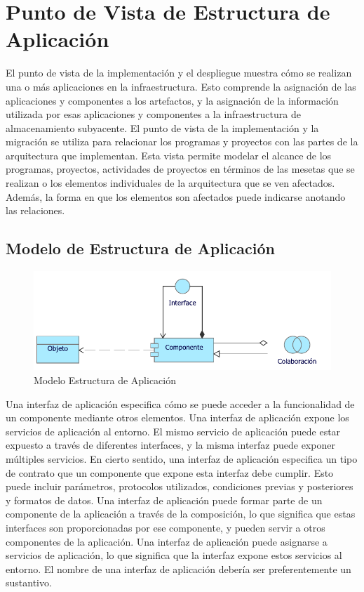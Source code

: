 \section{Punto de Vista de Estructura de Aplicación}

El punto de vista de la implementación y el despliegue muestra cómo se realizan una o más aplicaciones en la infraestructura. Esto comprende la asignación de las aplicaciones y componentes a los artefactos, y la asignación de la información utilizada por esas aplicaciones y componentes a la infraestructura de almacenamiento subyacente. 
El punto de vista de la implementación y la migración se utiliza para relacionar los programas y proyectos con las partes de la arquitectura que implementan. Esta vista permite modelar el alcance de los programas, proyectos, actividades de proyectos en términos de las mesetas que se realizan o los elementos individuales de la arquitectura que se ven afectados. Además, la forma en que los elementos son afectados puede indicarse anotando las relaciones.

\subsection{Modelo de Estructura de Aplicación}
\begin{figure}[h!]
	\centering
	\includegraphics[width=.8\linewidth]{imgs/modelo/EstrAplicacion}
	\caption{Modelo Estructura de Aplicación}
\end{figure}

Una interfaz de aplicación especifica cómo se puede acceder a la funcionalidad de un componente mediante otros elementos. Una interfaz de aplicación expone los servicios de aplicación al entorno. El mismo servicio de aplicación puede estar expuesto a través de diferentes interfaces, y la misma interfaz puede exponer múltiples servicios.
En cierto sentido, una interfaz de aplicación especifica un tipo de contrato que un componente que expone esta interfaz debe cumplir. Esto puede incluir parámetros, protocolos utilizados, condiciones previas y posteriores y formatos de datos.
Una interfaz de aplicación puede formar parte de un componente de la aplicación a través de la composición, lo que significa que estas interfaces son proporcionadas por ese componente, y pueden servir a otros componentes de la aplicación. Una interfaz de aplicación puede asignarse a servicios de aplicación, lo que significa que la interfaz expone estos servicios al entorno. El nombre de una interfaz de aplicación debería ser preferentemente un sustantivo.

